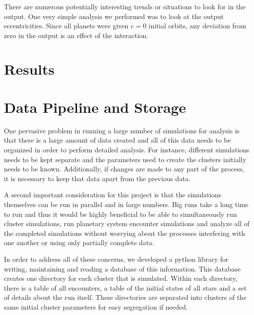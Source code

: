\documentclass[12pt]{article}
\begin{document}
    There are numerous potentially interesting trends or situations to look for in
    the output. One very simple analysis we performed was to look at the output
    eccentricities. Since all planets were given $e=0$ initial orbits, any deviation
    from zero in the output is an effect of the interaction.



\section{Results}




\section{Data Pipeline and Storage}

    One pervasive problem in running a large number of simulations for analysis is
    that there is a large amount of data created and all of this data needs to be
    organized in order to perform detailed analysis. For instance, different simulations
    needs to be kept separate and the parameters used to create the clusters initially
    needs to be known. Additionally, if changes are made to any part of the process, it
    is necessary to keep that data apart from the previous data.

    A second important consideration for this project is that the simulations themselves
    can be run in parallel and in large numbers. Big runs take a long time to run
    and thus it would be highly beneficial to be able to simultaneously run cluster
    simulations, run planetary system encounter simulations and analyze all of the
    completed simulations without worrying about the processes interfering with one
    another or using only partially complete data.

    In order to address all of these concerns, we developed a python library 
    for writing, maintaining and reading a database of this information. This database
    creates one directory for each cluster that is simulated. Within each directory,
    there is a table of all encounters, a table of the initial states of all stars
    and a set of details about the run itself. These directories are separated
    into clusters of the same initial cluster parameters for easy segregation if needed.
\end{document}
